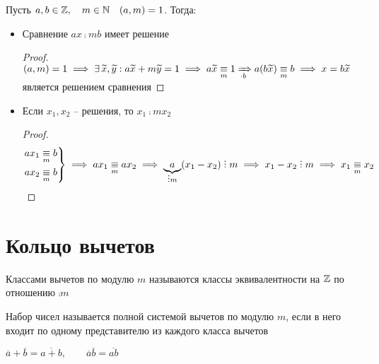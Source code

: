 \begin{property}
	Пусть $a, b \in \mathbb{Z}, \quad m \in \mathbb{N} \quad (a, m) = 1 $. Тогда:
	\begin{itemize}
		\item Сравнение $ax \comp{m} b$ имеет решение
		\begin{proof}
			$ (a, m) = 1 \implies \exists\, \widetilde{x}, \widetilde{y} : a\widetilde{x} + m\widetilde{y} = 1 \implies a\widetilde{x} \underset{m}{\equiv} 1 \xRightarrow[\cdot b]{} a(b\widetilde{x}) \underset{m}{\equiv} b \implies x = b\widetilde{x} $ является решением сравнения
		\end{proof}
		\item Если $x_1, x_2$ -- решения, то $ x_1 \comp{m} x_2 $
		\begin{proof}
			$$ \begin{rcases}
				ax_1 \comp{m} b \\
				ax_2 \comp{m} b
			\end{rcases} \implies ax_1 \comp{m} ax_2 \implies \underbrace{a}_{\divby m}(x_1 - x_2) \divby m \implies x_1 - x_2 \divby m \implies x_1 \comp{m} x_2 $$
		\end{proof}
	\end{itemize}
\end{property}

\section{Кольцо вычетов}

\begin{definition}
	Классами вычетов по модулю $m$ называются классы эквивалентности на $\mathbb{Z}$ по отношению $\comp{m}$
\end{definition}

\begin{definition}
	Набор чисел называется полной системой вычетов по модулю $m$, если в него входит по одному представителю из каждого класса вычетов
\end{definition}

\begin{definition}
	$ \overline{a} + \overline{b} = \overline{a + b}, \qquad \overline{a}\overline{b} = \overline{ab} $
\end{definition}

